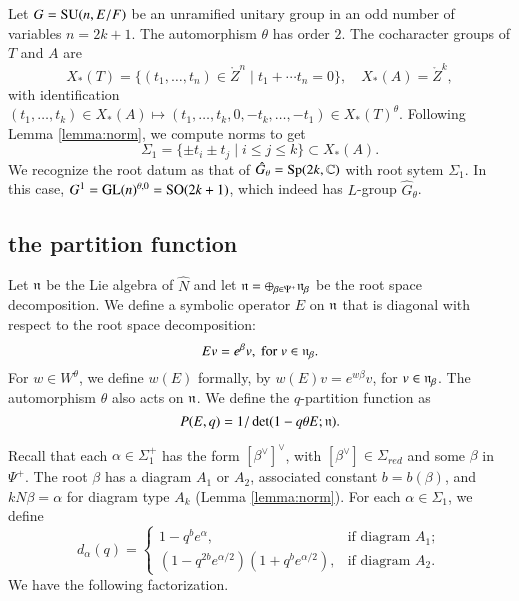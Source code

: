 \begin{example}  Let $G={\operatorname{SU}}(n,E/F)$ be an unramified unitary group in an odd number of variables $n=2k+1$.
The automorphism $\theta$ has order $2$.
The cocharacter groups of $T$ and $A$ are
\[
X_*(T) = \{(t_1,\ldots,t_{n})\in \ring{Z}^n\mid t_1+\cdots t_n=0\}, 
\quad
X_*(A)  = \ring{Z}^k,
\]
with identification $(t_1,\ldots,t_k)\in X_*(A)\mapsto (t_1,\ldots,t_k,0,-t_k,\ldots,-t_1)\in X_*(T)^\theta$.
Following Lemma \ref{lemma:norm}, we compute norms to get
\[
\Sigma_1 = \{\pm t_i\pm t_j\mid i\le j\le k\}\subset X_*(A).
\]
We recognize the root datum as that of $\hat G_\theta = {\operatorname{Sp}}(2k,\mathbb{C})$ with root sytem $\Sigma_1$.  
In this case, $G^1 = {\operatorname{GL}}(n)^{\theta,0} = {\operatorname{SO}}(2k+1)$, which indeed has $L$-group $\hat G_\theta$.
\end{example}







\subsection{the partition function}



Let ${\mathfrak n}$ be the Lie algebra of $\hat N$ and
let ${\mathfrak n} = \oplus_{\beta\in \Psi^+} {\mathfrak n}_\beta$ be the root space decomposition.  We define a symbolic operator $E$ on ${\mathfrak n}$ that is diagonal with
respect to the root space decomposition:
\[
E v = e^{\beta} v, \text{ for } v \in {\mathfrak n}_\beta.
\]
For $w\in W^\theta$, we define $w(E)$ formally, by $w(E) v = e^{ w \beta} v$, for $v\in {\mathfrak n}_\beta$.
The automorphism $\theta$ also acts on ${\mathfrak n}$.  We define the $q$-partition function as
\begin{equation}
P(E,q) = 1/\det(1- q \theta E;{\mathfrak n}).
\end{equation}

Recall that each $\alpha\in \Sigma^+_1$ has the form $[\beta^\vee]^\vee$, with $[\beta^\vee]\in \Sigma_{red}$
and some $\beta$  in $\Psi^+$.  The root $\beta$ has a diagram $A_1$ or $A_2$,
associated constant $b=b(\beta)$, and $k N\beta = \alpha$ for diagram type $A_k$ (Lemma \ref{lemma:norm}).
For each $\alpha\in \Sigma_1$, we define
\begin{equation}\label{eqn:d}
d_\alpha(q) =
\begin{cases} {1-q^b e^\alpha},    &\text{if diagram } A_1;\\
{(1-q^{2b} e^{\alpha/2})(1+q^b e^{\alpha/2})},
&\text{if diagram } A_2.
\end{cases}
\end{equation}
We have the following factorization.

